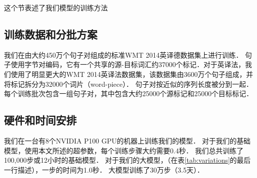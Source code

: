 
这个节表述了我们模型的训练方法


\subsection{训练数据和分批方案}
我们在由大约450万个句子对组成的标准WMT 2014英译德数据集上进行训练． 句子使用字节对编码\citep{DBLP:journals/corr/BritzGLL17}，它有一个共享的源-目标词汇约37000个标记．对于英译法，我们使用了明显更大的WMT 2014英译法数据集，该数据集由3600万个句子组成，并将标记拆分为32000个词片（word-piece）\citep{wu2016google}． 句子对按近似的序列长度被分到一起． 每个训练批次包含一组句子对，其中包含大约25000个源标记和25000个目标标记．  

\subsection{硬件和时间安排}


我们在一台有8个NVIDIA P100 GPU的机器上训练我们的模型． 对于我们的基础模型，使用本文所述的超参数，每个训练步骤大约需要0.4秒． 我们总共训练了100,000步或12小时的基础模型． 对于我们的大模型，（在表\ref{tab:variations}的最后一行描述），一步的时间为1.0秒． 大模型训练了30万步（3.5天）．

